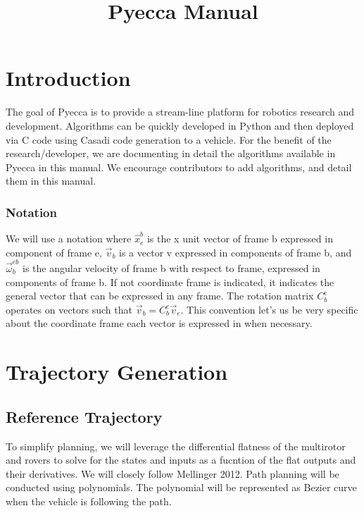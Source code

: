 \documentclass[10pt]{book}
\title{Pyecca Manual}
\date{}
\author{}
\begin{document}
\maketitle
\tableofcontents

\chapter{Introduction}

The goal of Pyecca is to provide a stream-line platform for robotics
research and development. Algorithms can be quickly developed in Python and then
deployed via C code using Casadi code generation to a vehicle. For the 
benefit of the research/developer, we are documenting in detail the
algorithms available in Pyecca in this manual. We encourage contributors
to add algorithms, and detail them in this manual.


\subsection*{Notation}

We will use a notation where $\hat{x}^b_e$ is the x unit vector of
frame b expressed in component of frame e, $\vec{v}_b$ is a vector v
expressed in components of frame b, and $\vec{\omega}^{eb}_b$ is the
angular velocity of frame b with respect to frame, expressed in
components of frame b. If not coordinate frame is indicated,
it indicates the general vector that can be expressed in any frame.
The rotation matrix $C^e_b$ operates on vectors such that
$\vec{v}_b = C^e_b \vec{v}_e$. This convention let's us be very
specific about the coordinate frame each vector is expressed in when necessary.


\chapter{Trajectory Generation}

\section{Reference Trajectory}

To simplify planning, we will leverage the differential flatness of the multirotor and rovers
to solve for the states and inputs as a fucntion of the flat outputs and
their derivatives. We will closely follow Mellinger 2012\cite{mellinger2012}. Path planning will be conducted using polynomials. The polynomial will be represented as Bezier
curve when the vehicle is following the path.
\end{document}
